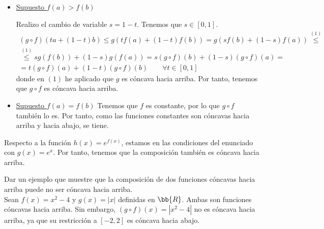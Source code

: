 \begin{ejercicio}
\begin{itemize}
        \item \underline{Supuesto $f(a)>f(b)$}

        Realizo el cambio de variable $s=1-t$. Tenemos que $s\in [0,1]$.
        \begin{multline*}
            (g\circ f)(ta + (1-t)b) 
            \leq g(tf(a) +(1-t)f(b)) 
            = g(sf(b) +(1-s)f(a))
            \stackrel{(1)}{\leq} \\ \stackrel{(1)}{\leq}
            sg(f(b)) +(1-s)g(f(a)) = s(g\circ f)(b)+(1-s)(g\circ f)(a)
            = \\ =
            t(g\circ f)(a)+(1-t)(g\circ f)(b)
            \qquad \forall t\in [0,1]
        \end{multline*}
        donde en $(1)$ he aplicado que $g$ es cóncava hacia arriba. Por tanto, tenemos que $g\circ f$ es cóncava hacia arriba.

        \item \underline{Supuesto $f(a)=f(b)$}
        Tenemos que $f$ es constante, por lo que $g\circ f$ también lo es. Por tanto, como las funciones constantes son cóncavas hacia arriba y hacia abajo, se tiene.
    \end{itemize}
    

    Respecto a la función $h(x)=e^{f(x)}$, estamos en las condiciones del enunciado con $g(x)=e^x$. Por tanto, tenemos que la composición también es cóncava hacia arriba.    
\end{ejercicio}

\begin{ejercicio}
    Dar un ejemplo que muestre que la composición de dos funciones cóncavas hacia arriba puede no ser cóncava hacia arriba.\\

    Sean $f(x)=x^2-4$ y $g(x)=|x|$ definidas en $\bb{R}$. Ambas son funciones cóncavas hacia arriba. Sin embargo, $(g\circ f)(x) = |x^2-4|$ no es cóncava hacia arriba, ya que su restricción a $[-2,2]$ es cóncava hacia abajo.
\end{ejercicio}

